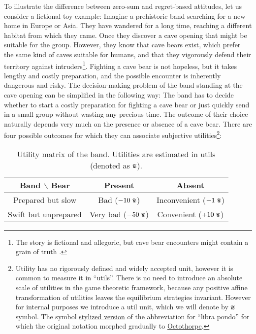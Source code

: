 \documentclass{article}
\newcommand{\util}{\scalebox{0.75}{\text{\Pfund}}}
\begin{document}
To illustrate the difference between zero-sum and regret-based attitudes, let us consider a fictional toy example:
Imagine a prehistoric band searching for a new home in Europe or Asia. They have wandered for a long time, reaching a different habitat from which they came. Once they discover a cave opening that might be suitable for the group. However, they know that cave bears exist, which prefer the same kind of caves suitable for humans, and that they vigorously defend their territory against intruders\footnote{The story is fictional and allegoric, but cave bear encounters might contain a grain of truth \cite{book:Bear,paper:CaveBear,book:PleistoceneMammals}.}.
Fighting a cave bear is not hopeless, but it takes lengthy and costly preparation, and the possible encounter is inherently dangerous and risky.
The decision-making problem of the band standing at the cave opening can be simplified in the following way:
The band has to decide whether to start a costly preparation for fighting a cave bear or just quickly send in a small group without wasting any precious time.
The outcome of their choice naturally depends very much on the presence or absence of a cave bear.
There are four possible outcomes for which they can associate subjective utilities\footnote{Utility has no rigorously defined and widely accepted unit, however it is common to measure it in ``utils''. There is no need to introduce an absolute scale of utilities in the game theoretic framework, because any positive affine transformation of utilities leaves the equilibrium strategies invariant. However for internal purposes we introduce a util unit, which we will denote by $\util$ symbol. The symbol \href{https://en.wikipedia.org/wiki/Number_sign}{stylized version} of the abbreviation for ``libra pondo'' \cite{book:ShadyCharacters} for which the original notation morphed gradually to \href{https://www.newyorker.com/books/page-turner/the-ancient-roots-of-punctuation}{Octothorpe}.}:


\begin{table}[h!]
    \centering
    \begin{tabular}{c|cc}
        Band $\backslash$ Bear & Present & Absent \\
        \hline
        Prepared but slow & Bad ($-10\ \util$) & Inconvenient ($-1\ \util$) \\
        Swift but unprepared & Very bad ($-50\ \util$) & Convenient ($+10\ \util$) \\
    \end{tabular}
    \caption{Utility matrix of the band. Utilities are estimated in utils (denoted as $\util$).}
    \label{tab:BandBearUtilityMatrix}
\end{table}
\end{document}
